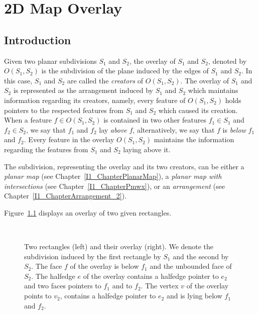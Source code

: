 \def\Ipe#1{\def\IPEfile{#1}}

\renewcommand{\Re}{{\rm I\!\hspace{-0.025em} R}}

\def\C{{\cal C}}
\def\G{{\cal G}}
\def\F{{\cal F}}
\def\I{{\cal I}}
\def\U{{\cal U}}
\def\M{{\cal M}}
\def\eps{{\varepsilon}}
\def\bd{{\partial}}
\def\dm{{\cal D}}

\chapter{2D Map Overlay} 
\label{I1_ChapterMapOverlay_2}

\section{Introduction}

Given two planar subdivisions $S_1$ and $S_2$, the overlay of 
$S_1$ and $S_2$, denoted by $O(S_1,S_2)$ is the subdivision 
of the plane induced by the edges of $S_1$ and $S_2$.
In this case, $S_1$ and $S_2$ are called the {\em creators} 
of $O(S_1,S_2)$. The overlay of $S_1$ and $S_2$ is represented as the 
arrangement induced by $S_1$ and $S_2$ which maintains information 
regarding its creators, namely, every feature of $O(S_1,S_2)$ holds pointers 
to the respected features from $S_1$ and $S_2$ which caused its creation.
When a feature $f \in O(S_1,S_2)$ is contained in two other features 
$f_1 \in S_1$ and $f_2 \in S_2$, we say that $f_1$ and $f_2$ 
lay {\em above} $f$, alternatively, we say that 
$f$ is {\em below} $f_1$ and $f_2$.
Every feature in the overlay $O(S_1, S_2)$ maintains the 
information regarding the features from $S_1$ and $S_2$ laying above it.

The subdivision, representing the overlay and its two creators, 
can be either a {\it planar map} 
(see Chapter~\ref{I1_ChapterPlanarMap}), 
a {\it planar map with intersections} 
(see Chapter~\ref{I1_ChapterPmwx}), or an {\it arrangement} 
(see Chapter~\ref{I1_ChapterArrangement_2}).

Figure~\ref{fig:overlay_example} displays an overlay of two given rectangles.

\begin{figure}
\begin{center}
\  \
\end{center}
\vspace{-2ex}
\caption{Two rectangles (left) and their overlay (right). We denote the subdivision 
induced by the first rectangle by $S_1$ and the second by $S_2$. 
The face $f$ of the overlay is below $f_1$ and the unbounded face of $S_2$. 
The halfedge $e$ of the overlay contains a halfedge pointer to $e_2$ and two faces pointers 
to $f_1$ and to $f_2$. The vertex $v$ of the overlay points to $v_2$, contains a halfedge 
pointer to $e_2$ and is lying below $f_1$ and $f_2$.}
\label{fig:overlay_example}
\end{figure}

